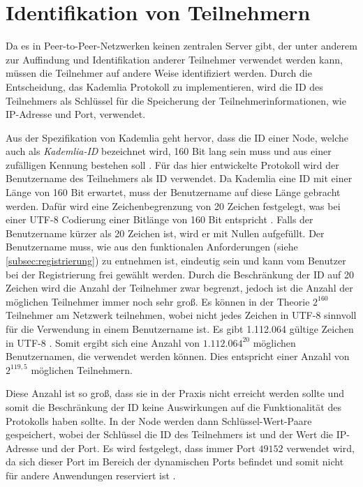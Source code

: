 \section{Identifikation von Teilnehmern}
\label{subsec:identifikation_von_teilnehmern}

Da es in Peer-to-Peer-Netzwerken keinen zentralen Server gibt, der unter anderem zur Auffindung und Identifikation anderer Teilnehmer verwendet werden kann, müssen die Teilnehmer auf andere Weise identifiziert werden. Durch die Entscheidung, das Kademlia Protokoll zu implementieren, wird die ID des Teilnehmers als Schlüssel für die Speicherung der Teilnehmerinformationen, wie IP-Adresse und Port, verwendet.

Aus der Spezifikation von Kademlia geht hervor, dass die ID einer Node, welche auch als \textit{Kademlia-ID} bezeichnet wird, 160 Bit lang sein muss und aus einer zufälligen Kennung bestehen soll \parencite[S. 2]{Maymounkov_Kademlia}. Für das hier entwickelte Protokoll wird der Benutzername des Teilnehmers als ID verwendet. Da Kademlia eine ID mit einer Länge von 160 Bit erwartet, muss der Benutzername auf diese Länge gebracht werden. Dafür wird eine Zeichenbegrenzung von 20 Zeichen festgelegt, was bei einer UTF-8 Codierung einer Bitlänge von 160 Bit entspricht \parencite{rfc3629_utf-8}. Falls der Benutzername kürzer als 20 Zeichen ist, wird er mit Nullen aufgefüllt.
Der Benutzername muss, wie aus den funktionalen Anforderungen (siehe \ref{subsec:registrierung}) zu entnehmen ist, eindeutig sein und kann vom Benutzer bei der Registrierung frei gewählt werden. 
Durch die Beschränkung der ID auf 20 Zeichen wird die Anzahl der Teilnehmer zwar begrenzt, jedoch ist die Anzahl der möglichen Teilnehmer immer noch sehr groß. Es können in der Theorie $2^{160}$ Teilnehmer am Netzwerk teilnehmen, wobei nicht jedes Zeichen in UTF-8 sinnvoll für die Verwendung in einem Benutzername ist. Es gibt 1.112.064 gültige Zeichen in UTF-8 \parencite{rfc3629_utf-8}. Somit ergibt sich eine Anzahl von $1.112.064^{20}$ möglichen Benutzernamen, die verwendet werden können. Dies entspricht einer Anzahl von $2^{119,5}$ möglichen Teilnehmern. 

Diese Anzahl ist so groß, dass sie in der Praxis nicht erreicht werden sollte und somit die Beschränkung der ID keine Auswirkungen auf die Funktionalität des Protokolls haben sollte.
In der Node werden dann Schlüssel-Wert-Paare gespeichert, wobei der Schlüssel die ID des Teilnehmers ist und der Wert die IP-Adresse und der Port. Es wird festgelegt, dass immer Port $49152$ verwendet wird, da sich dieser Port im Bereich der dynamischen Ports befindet und somit nicht für andere Anwendungen reserviert ist \parencite[S. 20]{rfc6335_IANA_Ports}. 

